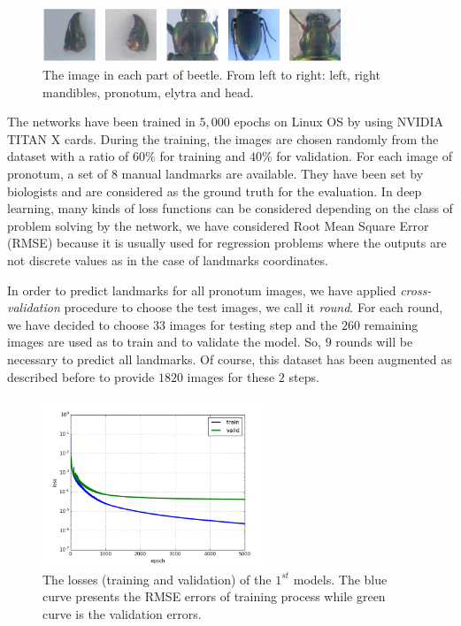 \documentclass[review]{elsarticle}
\begin{document}
\begin{figure}[h]
	\centering
	\includegraphics[width=0.8\textwidth]{images/images5parts}
	\caption{The image in each part of beetle. From left to right:
          left, right mandibles, pronotum, elytra and head.}
	\label{fig5parts}
\end{figure}
The networks have been trained in $5, 000$ epochs on Linux OS by using
NVIDIA TITAN X cards. During the training, the images are chosen
randomly from the dataset with a ratio of $60\%$ for training and
$40\%$ for validation. For each image of pronotum, a set of $8$ manual
landmarks are available. They have been set by biologists and are
considered as the ground truth for the evaluation. In deep learning,
many kinds of loss functions can be considered depending on the
class of problem solving by the network, we have considered Root Mean
Square Error (RMSE) because it is usually used for regression problems
where the outputs are not discrete values as in the case of landmarks coordinates.

In order to predict landmarks for all pronotum images, we have applied
\textit{cross-validation} procedure to choose the test images, we call
it \textit{round}. For each round, we have decided to choose $33$
images for testing step and the $260$ remaining images are used as
to train and to validate the model. So, $9$ rounds will be necessary to predict
all landmarks. Of course, this dataset has been
augmented as described before to provide $1820$ images for these $2$
steps.

\begin{figure}[h!]
    \centering
    \includegraphics[width=0.6\textwidth]{images/model1_loss}
    \caption{The losses (training and validation) of the $1^{st}$ models. The
      blue curve presents the RMSE errors of training process while
      green curve is the validation errors.}
    \label{figlosses}
\end{figure}
\end{document}
